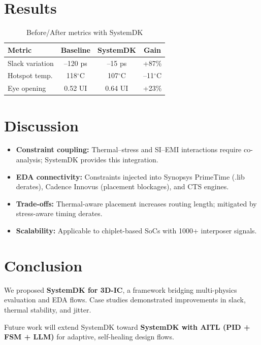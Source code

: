 \documentclass[conference]{IEEEtran}
\begin{document}
\section{Results}
\begin{table}[htbp]
\centering
\caption{Before/After metrics with SystemDK}
\label{tab:results}
\setlength{\tabcolsep}{4pt}
\renewcommand{\arraystretch}{1.2}
\begin{tabular}{|l|c|c|c|}
\hline
\textbf{Metric} & \textbf{Baseline} & \textbf{SystemDK} & \textbf{Gain} \\
\hline
Slack variation & --120 ps & --15 ps & +87\% \\
Hotspot temp. & 118$^\circ$C & 107$^\circ$C & --11$^\circ$C \\
Eye opening & 0.52 UI & 0.64 UI & +23\% \\
\hline
\end{tabular}
\end{table}

\section{Discussion}
\begin{itemize}
  \item \textbf{Constraint coupling:} Thermal–stress and SI–EMI interactions require co-analysis; SystemDK provides this integration.
  \item \textbf{EDA connectivity:} Constraints injected into Synopsys PrimeTime (.lib derates), Cadence Innovus (placement blockages), and CTS engines.
  \item \textbf{Trade-offs:} Thermal-aware placement increases routing length; mitigated by stress-aware timing derates.
  \item \textbf{Scalability:} Applicable to chiplet-based SoCs with 1000+ interposer signals.
\end{itemize}

\section{Conclusion}
We proposed \textbf{SystemDK for 3D-IC}, a framework bridging multi-physics evaluation and EDA flows. Case studies demonstrated improvements in slack, thermal stability, and jitter. 

Future work will extend SystemDK toward \textbf{SystemDK with AITL (PID + FSM + LLM)} for adaptive, self-healing design flows.
\end{document}
